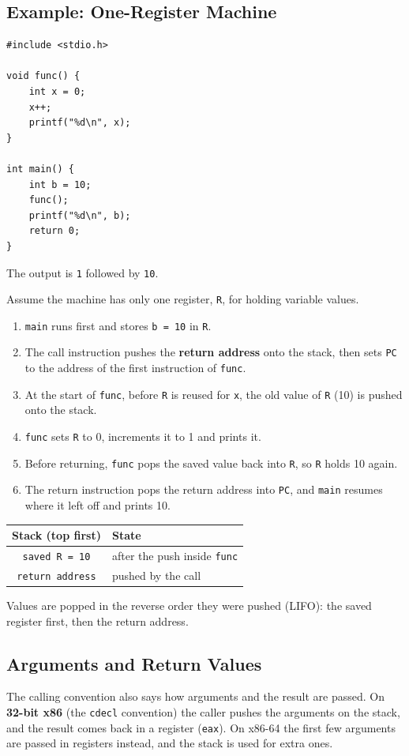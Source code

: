\documentclass{article}
\newcommand{\reg}[1]{\texttt{#1}}
\begin{document}
\subsection{Example: One-Register Machine}
\begin{verbatim}
#include <stdio.h>

void func() {
	int x = 0;
	x++;
	printf("%d\n", x);
}

int main() {
	int b = 10;
	func();
	printf("%d\n", b);
	return 0;
}
\end{verbatim}
The output is \texttt{1} followed by \texttt{10}.

Assume the machine has only one register, \reg{R}, for holding variable values.

\begin{enumerate}
	\item \texttt{main} runs first and stores \texttt{b = 10} in \reg{R}.
	\item The call instruction pushes the \textbf{return address} onto the stack, then sets \reg{PC} to the address of the first instruction of \texttt{func}.
	\item At the start of \texttt{func}, before \reg{R} is reused for \texttt{x}, the old value of \reg{R} (10) is pushed onto the stack.
	\item \texttt{func} sets \reg{R} to 0, increments it to 1 and prints it.
	\item Before returning, \texttt{func} pops the saved value back into \reg{R}, so \reg{R} holds 10 again.
	\item The return instruction pops the return address into \reg{PC}, and \texttt{main} resumes where it left off and prints 10.
\end{enumerate}

\begin{table}[H]
	\centering
	\begin{tabular}{cl}
		\toprule
		\textbf{Stack (top first)} & \textbf{State} \\
		\midrule
		\texttt{saved R = 10} & after the push inside \texttt{func} \\
		\texttt{return address} & pushed by the call \\
		\bottomrule
	\end{tabular}
\end{table}
Values are popped in the reverse order they were pushed (LIFO): the saved register first, then the return address.

\subsection{Arguments and Return Values}
The calling convention also says how arguments and the result are passed. On \textbf{32-bit x86} (the \texttt{cdecl} convention) the caller pushes the arguments on the stack, and the result comes back in a register (\texttt{eax}). On x86-64 the first few arguments are passed in registers instead, and the stack is used for extra ones.
\end{document}
